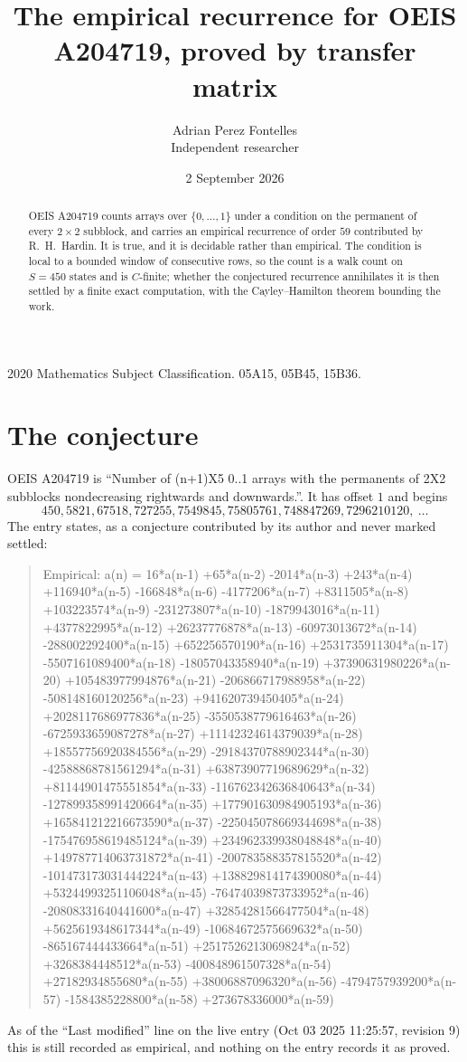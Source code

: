 \documentclass[11pt,a4paper]{article}
\title{The empirical recurrence for OEIS A204719, proved by transfer matrix}
\author{Adrian Perez Fontelles\\ \small Independent researcher}
\date{2 September 2026}
\theoremstyle{plain}
\theoremstyle{definition}
\begin{document}
\maketitle

\begin{abstract}
OEIS A204719 counts arrays over $\{0,\dots,1\}$ under a condition on the permanent of every
$2\times2$ subblock, and carries an empirical recurrence of order $59$ contributed by
R.~H.~Hardin. It is true, and it is decidable rather than empirical. The condition is local to
a bounded window of consecutive rows, so the count is a walk count on $S=450$ states and is
$C$-finite; whether the conjectured recurrence annihilates it is then settled by a finite exact
computation, with the Cayley--Hamilton theorem bounding the work.
\end{abstract}

\noindent\small 2020 Mathematics Subject Classification. 05A15, 05B45, 15B36.\normalsize

\section{The conjecture}

OEIS A204719 is ``Number of (n+1)X5 0..1 arrays with the permanents of 2X2 subblocks nondecreasing rightwards and downwards.''. It has offset $1$ and begins
\[
450, 5821, 67518, 727255, 7549845, 75805761, 748847269, 7296210120,\ \dots
\]
The entry states, as a conjecture contributed by its author and never marked settled:
\begin{quote}
Empirical: a(n) = 16*a(n-1) +65*a(n-2) -2014*a(n-3) +243*a(n-4) +116940*a(n-5) -166848*a(n-6) -4177206*a(n-7) +8311505*a(n-8) +103223574*a(n-9) -231273807*a(n-10) -1879943016*a(n-11) +4377822995*a(n-12) +26237776878*a(n-13) -60973013672*a(n-14) -288002292400*a(n-15) +652256570190*a(n-16) +2531735911304*a(n-17) -5507161089400*a(n-18) -18057043358940*a(n-19) +37390631980226*a(n-20) +105483977994876*a(n-21) -206866717988958*a(n-22) -508148160120256*a(n-23) +941620739450405*a(n-24) +2028117686977836*a(n-25) -3550538779616463*a(n-26) -6725933659087278*a(n-27) +11142324614379039*a(n-28) +18557756920384556*a(n-29) -29184370788902344*a(n-30) -42588868781561294*a(n-31) +63873907719689629*a(n-32) +81144901475551854*a(n-33) -116762342636840643*a(n-34) -127899358991420664*a(n-35) +177901630984905193*a(n-36) +165841212216673590*a(n-37) -225045078669344698*a(n-38) -175476958619485124*a(n-39) +234962339938048848*a(n-40) +149787714063731872*a(n-41) -200783588357815520*a(n-42) -101473173031444224*a(n-43) +138829814174390080*a(n-44) +53244993251106048*a(n-45) -76474039873733952*a(n-46) -20808331640441600*a(n-47) +32854281566477504*a(n-48) +5625619348617344*a(n-49) -10684672575669632*a(n-50) -865167444433664*a(n-51) +2517526213069824*a(n-52) +3268384448512*a(n-53) -400848961507328*a(n-54) +27182934855680*a(n-55) +38006887096320*a(n-56) -4794757939200*a(n-57) -1584385228800*a(n-58) +273678336000*a(n-59)
\end{quote}
As of the ``Last modified'' line on the live entry (Oct 03 2025 11:25:57, revision 9) this is still
recorded as empirical, and nothing on the entry records it as proved.
\end{document}
